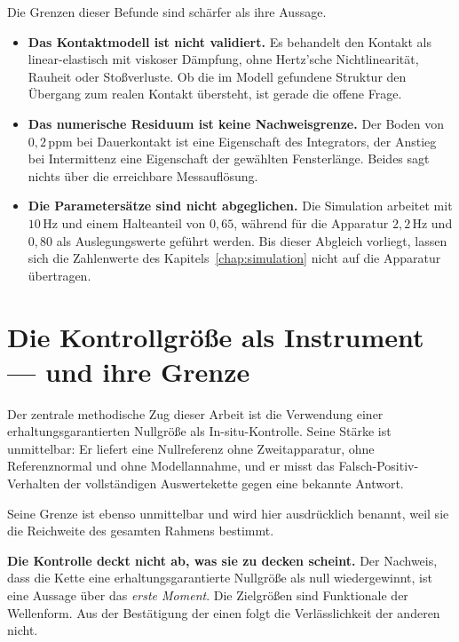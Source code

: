 \documentclass[12pt,a4paper]{report}
\begin{document}
Die Grenzen dieser Befunde sind schärfer als ihre Aussage.

\begin{itemize}
\item \textbf{Das Kontaktmodell ist nicht validiert.} Es behandelt den
      Kontakt als linear-elastisch mit viskoser Dämpfung, ohne
      Hertz'sche Nichtlinearität, Rauheit oder Stoßverluste. Ob die im
      Modell gefundene Struktur den Übergang zum realen Kontakt
      übersteht, ist gerade die offene Frage.
\item \textbf{Das numerische Residuum ist keine Nachweisgrenze.} Der
      Boden von $0{,}2\,\mathrm{ppm}$ bei Dauerkontakt ist eine
      Eigenschaft des Integrators, der Anstieg bei Intermittenz eine
      Eigenschaft der gewählten Fensterlänge. Beides sagt nichts über
      die erreichbare Messauflösung.
\item \textbf{Die Parametersätze sind nicht abgeglichen.} Die Simulation
      arbeitet mit $10\,\mathrm{Hz}$ und einem Halteanteil von $0{,}65$,
      während für die Apparatur $2{,}2\,\mathrm{Hz}$ und $0{,}80$ als
      Auslegungswerte geführt werden. Bis dieser Abgleich vorliegt,
      lassen sich die Zahlenwerte des Kapitels~\ref{chap:simulation}
      nicht auf die Apparatur übertragen.
\end{itemize}

\section{Die Kontrollgröße als Instrument --- und ihre Grenze}
\label{sec:kontrollgrenze}

Der zentrale methodische Zug dieser Arbeit ist die Verwendung einer
erhaltungsgarantierten Nullgröße als In-situ-Kontrolle. Seine Stärke ist
unmittelbar: Er liefert eine Nullreferenz ohne Zweitapparatur, ohne
Referenznormal und ohne Modellannahme, und er misst das
Falsch-Positiv-Verhalten der vollständigen Auswertekette gegen eine
bekannte Antwort.

Seine Grenze ist ebenso unmittelbar und wird hier ausdrücklich benannt,
weil sie die Reichweite des gesamten Rahmens bestimmt.

\vspace{0.5em}

\textbf{Die Kontrolle deckt nicht ab, was sie zu decken scheint.} Der
Nachweis, dass die Kette eine erhaltungsgarantierte Nullgröße als null
wiedergewinnt, ist eine Aussage über das \emph{erste Moment}. Die
Zielgrößen sind Funktionale der Wellenform. Aus der Bestätigung der
einen folgt die Verlässlichkeit der anderen nicht.
\end{document}
